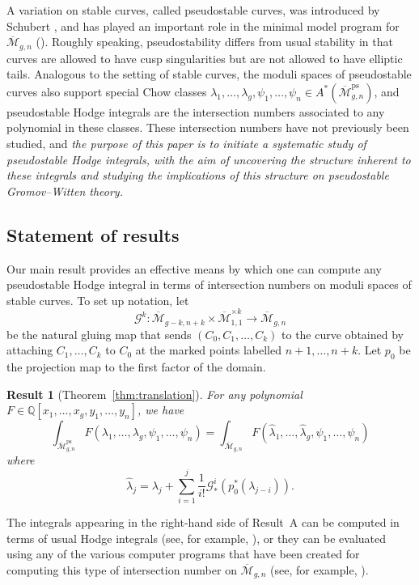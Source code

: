 \documentclass[12pt]{amsart}
\newcounter{intro}[section]
\newtheorem{result}[intro]{Result}
\theoremstyle{definition}
\newcommand{\M}{\overline{\mathcal{M}}}
\newcommand{\ps}{\mathrm{ps}}
\newcommand{\G}{\mathcal{G}}
\newcommand{\Q}{\mathbb{Q}}
\numberwithin{equation}{section}
\begin{document}
A variation on stable curves, called pseudostable curves, was introduced by Schubert \cite{Schubert}, and has played an important role in the minimal model program for $\M_{g,n}$ (\cite{HH}). Roughly speaking, pseudostability differs from usual stability in that curves are allowed to have cusp singularities but are not allowed to have elliptic tails. Analogous to the setting of stable curves, the moduli spaces of pseudostable curves also support special Chow classes $\lambda_1,\dots,\lambda_g,\psi_1,\dots,\psi_n\in A^*(\M_{g,n}^\ps)$, and pseudostable Hodge integrals are the intersection numbers associated to any polynomial in these classes. These intersection numbers have not previously been studied, and \emph{the purpose of this paper is to initiate a systematic study of pseudostable Hodge integrals, with the aim of uncovering the structure inherent to these integrals and studying the implications of this structure on pseudostable Gromov--Witten theory. }

\subsection{Statement of results}

Our main result provides an effective means by which one can compute any pseudostable Hodge integral in terms of intersection numbers on moduli spaces of stable curves. To set up notation, let
\[
\G^k:\M_{g-k,n+k}\times\M_{1,1}^{\times k}\rightarrow \M_{g,n}
\]
be the natural gluing map that sends $(C_0, C_1, \ldots, C_k)$ to the curve obtained by attaching $C_1, \ldots, C_k$ to $C_0$ at the marked points labelled $n+1, \ldots, n+k$. Let $p_0$ be the projection map to the first factor of the domain. 

\begin{result}[Theorem~\ref{thm:translation}]
For any polynomial $F\in\Q[x_1,\dots,x_g,y_1,\dots,y_n]$, we have
\[
\int_{\M_{g,n}^\ps}F(\lambda_1,\dots,\lambda_g,\psi_1,\dots,\psi_n)=\int_{\M_{g,n}}F(\hat\lambda_1,\dots,\hat\lambda_g,\psi_1,\dots,\psi_n)
\]
where
\[
\hat\lambda_j=\lambda_j+\sum_{i=1}^j\frac{1}{i!}\G_*^{i}(p_0^*(\lambda_{j-i})).
\]	
\end{result}

The integrals appearing in the right-hand side of Result~A can be computed in terms of usual Hodge integrals (see, for example, \cite{Yang}), or they can be evaluated using any of the various computer programs that have been created for computing this type of intersection number on $\M_{g,n}$ (see, for example, \cite{DSvZ}). 
\end{document}
